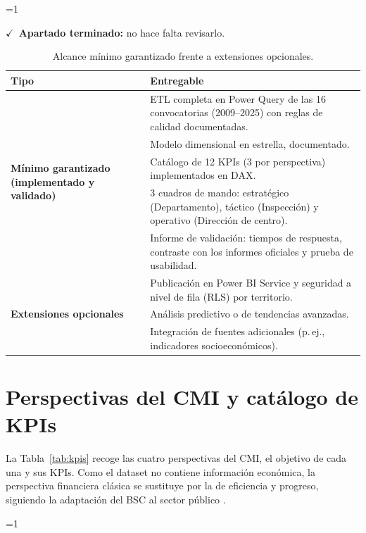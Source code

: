 \documentclass[12pt, a4paper, oneside]{report}
\newcommand{\mostrarterminados}{1}
\newenvironment{revisado}
  {\ifnum\mostrarterminados=1\relax\begin{cajarevisada}\noindent\colorbox{verdeterminado}{\parbox{\dimexpr\linewidth-2\fboxsep\relax}{\small$\checkmark$\ \textbf{Apartado terminado:} no hace falta revisarlo.}}\par\medskip\fi}
  {\ifnum\mostrarterminados=1\relax\end{cajarevisada}\fi}
\begin{document}
\begin{revisado}
\begin{table}[H]
\centering
\small
\renewcommand{\arraystretch}{1.1}
\begin{tabularx}{\textwidth}{@{} p{3.2cm} X @{}}
\toprule
\textbf{Tipo} & \textbf{Entregable} \\ \midrule
\multirow{5}{3.2cm}{\textbf{Mínimo garantizado (implementado y validado)}}
 & ETL completa en Power Query de las 16 convocatorias (2009--2025) con reglas de calidad documentadas. \\
 & Modelo dimensional en estrella, documentado. \\
 & Catálogo de 12 KPIs (3 por perspectiva) implementados en DAX. \\
 & 3 cuadros de mando: estratégico (Departamento), táctico (Inspección) y operativo (Dirección de centro). \\
 & Informe de validación: tiempos de respuesta, contraste con los informes oficiales y prueba de usabilidad. \\ \midrule
\multirow{3}{3.2cm}{\textbf{Extensiones opcionales}}
 & Publicación en Power BI Service y seguridad a nivel de fila (RLS) por territorio. \\
 & Análisis predictivo o de tendencias avanzadas. \\
 & Integración de fuentes adicionales (p.\,ej., indicadores socioeconómicos). \\ \bottomrule
\end{tabularx}
\caption{Alcance mínimo garantizado frente a extensiones opcionales.}
\label{tab:alcance}
\end{table}

\section{Perspectivas del CMI y catálogo de KPIs}
\label{sec:kpis}
La Tabla~\ref{tab:kpis} recoge las cuatro perspectivas del CMI, el objetivo de cada una y sus KPIs. Como el dataset no contiene información económica, la perspectiva financiera clásica se sustituye por la de eficiencia y progreso, siguiendo la adaptación del BSC al sector público \cite{niven2008balanced}.


\end{revisado}
\end{document}
